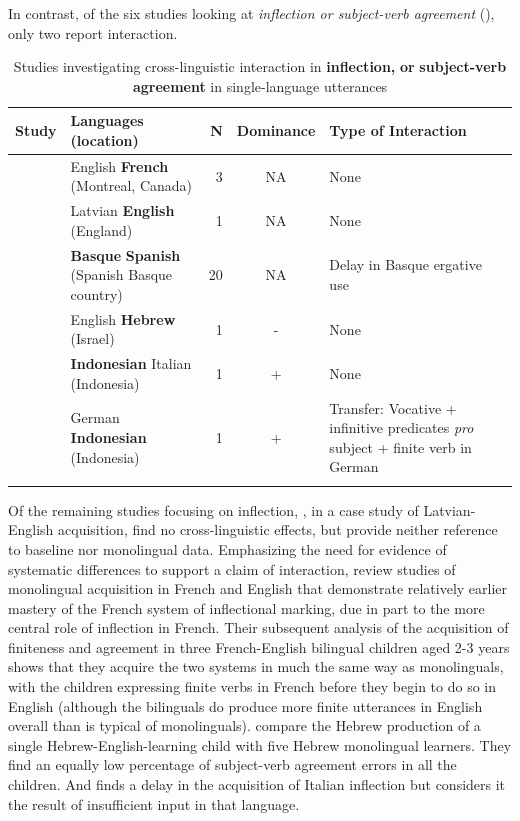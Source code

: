 \documentclass[output=paper]{langscibook}
\begin{document}
In contrast, of the six studies looking at \textit{inflection or subject-verb agreement} (), only two report interaction.

\begin{table}[t]
\begin{tabularx}{\textwidth}{QQ@{}rcQ}
\lsptoprule
{ Study} & { Languages} { (location)} & { N}  & { Dominance} & { Type of Interaction}\\
\midrule
\citet{ParadisGenesee1996} & English \textbf{French} (Montreal, Canada) & 3 & NA & None\\
\tablevspace
\citet{SinkaSchelleter1998} & Latvian \textbf{English} (England) & 1 & NA & None\\
\tablevspace
\citet{Austin2007} & \textbf{Basque} \textbf{Spanish} (Spanish Basque country) & 20 & NA & Delay in Basque ergative use  \\
\tablevspace
\citet{HacohenSchaeffer2007} & English \textbf{Hebrew} (Israel) & 1 & - & None\\
\tablevspace
\citet{Soriente2014} & \textbf{Indonesian} Italian (Indonesia) & 1 & + & None\\
\tablevspace
\citet{AdnyaniEtAl2018} & German \textbf{Indonesian} (Indonesia) & 1 & + & Transfer: Vocative + infinitive predicates \textit{pro} subject + finite verb in German\\
\lspbottomrule
\end{tabularx}
\caption{Studies investigating cross-linguistic interaction in \textbf{inflection,} \textbf{or} \textbf{subject-verb} \textbf{agreement} in single-language utterances}
\label{tab:vihmannvihmann:3}
\end{table}

Of the remaining studies focusing on inflection, \citet{SinkaScheletter1998}, in a case study of Latvian-English acquisition, find no cross-linguistic effects, but provide neither reference to baseline nor monolingual data. Emphasizing the need for evidence of systematic differences to support a claim of interaction, \citet{ParadisGenesee1996} review studies of monolingual acquisition in French and English that demonstrate relatively earlier mastery of the French system of inflectional marking, due in part to the more central role of inflection in French. Their subsequent analysis of the acquisition of finiteness and agreement in three French-English bilingual children aged 2-3 years shows that they acquire the two systems in much the same way as monolinguals, with the children expressing finite verbs in French before they begin to do so in English (although the bilinguals do produce more finite utterances in English overall than is typical of monolinguals). \citet{HacohenSchaeffer2007} compare the Hebrew production of a single Hebrew-English-learning child with five Hebrew monolingual learners. They find an equally low percentage of subject-verb agreement errors in all the children. And \citet{Soriente2014} finds a delay in the acquisition of Italian inflection but considers it the result of insufficient input in that language.
\end{document}
